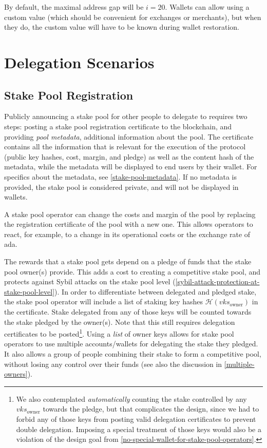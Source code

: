 \documentclass[11pt,a4paper,dvipsnames,twosided]{article}
\begin{document}
By default, the maximal address gap will be \(i=20\). Wallets can
allow using a custom value (which should be convenient for exchanges
or merchants), but when they do, the custom value will have to be
known during wallet restoration.

\section{Delegation Scenarios}
\label{delegation-scenarios}

\subsection{Stake Pool Registration}
\label{stake-pool-registration}

Publicly announcing a stake pool for other people to delegate to requires two
steps: posting a stake pool registration certificate to the blockchain, and
providing \emph{pool metadata}, additional information about the pool. The
certificate contains all the information that is relevant for the execution of
the protocol (public key hashes, cost, margin, and pledge) as well as the
content hash of the metadata, while the metadata will be displayed to end users
by their wallet. For specifics about the metadata, see
\cref{stake-pool-metadata}. If no metadata is provided, the stake pool is
considered private, and will not be displayed in wallets.

A stake pool operator can change the costs and margin of the pool by
replacing the registration certificate of the pool with a new
one. This allows operators to react, for example, to a change in its
operational costs or the exchange rate of ada.

The rewards that a stake pool gets depend on a pledge of funds that
the stake pool owner(s) provide. This adds a cost to creating a
competitive stake pool, and protects against Sybil attacks on the
stake pool level
(\cref{sybil-attack-protection-at-stake-pool-level}). In order to
differentiate between delegated and pledged stake, the stake pool
operator will include a list of staking key hashes
\(\mathcal{H}(vks_\text{owner})\)
in the certificate. Stake delegated from any of those keys will be
counted towards the stake pledged by the owner(s). Note that this
still requires delegation certificates to be posted\footnote{We also
  contemplated \emph{automatically} counting the stake controlled by
  any \(vks_\text{owner}\)
  towards the pledge, but that complicates the design, since we had
  to forbid any of those keys from posting valid delegation
  certificates to prevent double delegation. Imposing a special
  treatment of those keys would also be a violation of the design goal
  from \cref{no-special-wallet-for-stake-pool-operators}.}.
Using a \emph{list} of owner keys allows for stake pool operators
to use multiple accounts/wallets for delegating the stake they
pledged. It also allows a group of people combining their stake to
form a competitive pool, without losing any control over their funds
(see also the discussion in \cref{multiple-owners}).
\end{document}

